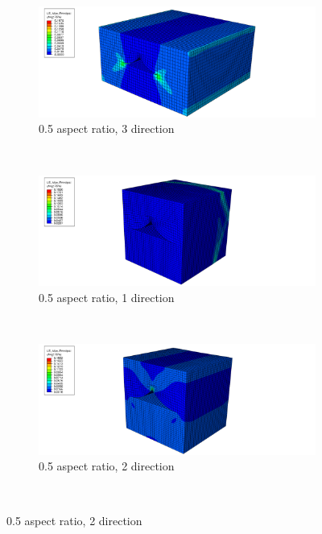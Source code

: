     \begin{figure}
    \centering
  \begin{subfigure}[b]{0.70\textwidth}
    \includegraphics[width=\textwidth]{chapter_7_non-elasticmodelling/figures/05p3.png}
    \caption{0.5 aspect ratio, 3 direction}
  \end{subfigure}
  \\
    \begin{subfigure}[b]{0.80\textwidth}
    \includegraphics[width=\textwidth]{chapter_7_non-elasticmodelling/figures/1p1.png}
    \caption{0.5 aspect ratio, 1 direction}
  \end{subfigure}
  \\
    \begin{subfigure}[b]{0.80\textwidth}
    \includegraphics[width=\textwidth]{chapter_7_non-elasticmodelling/figures/1p2.png}
    \caption{0.5 aspect ratio, 2 direction}
  \end{subfigure}
  \\

\end{figure}

